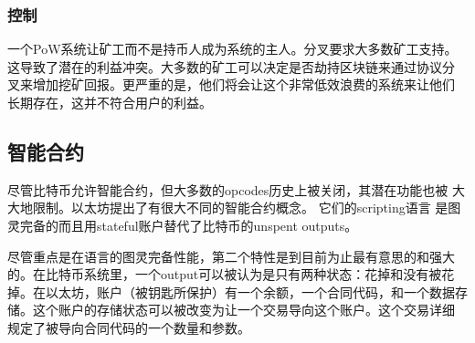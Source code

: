 \documentclass[letterpaper]{article}
\begin{document}
\subsubsection{控制}
一个PoW系统让矿工而不是持币人成为系统的主人。分叉要求大多数矿工支持。
这导致了潜在的利益冲突。大多数的矿工可以决定是否劫持区块链来通过协议分
叉来增加挖矿回报。更严重的是，他们将会让这个非常低效浪费的系统来让他们
长期存在，这并不符合用户的利益。

\subsection{智能合约}
尽管比特币允许智能合约，但大多数的opcodes历史上被关闭，其潜在功能也被
大大地限制。以太坊提出了有很大不同的智能合约概念。 它们的scripting语言
是图灵完备的而且用stateful账户替代了比特币的unspent outputs。

尽管重点是在语言的图灵完备性能，第二个特性是到目前为止最有意思的和强大
的。在比特币系统里，一个output可以被认为是只有两种状态：花掉和没有被花
掉。在以太坊，账户（被钥匙所保护）有一个余额，一个合同代码，和一个数据存
储。这个账户的存储状态可以被改变为让一个交易导向这个账户。这个交易详细
规定了被导向合同代码的一个数量和参数。
\end{document}
